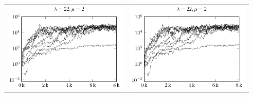 \begin{tabular}{@{}l@{}l@{}}
\includegraphics[scale=1]{plots/ce_ConstantNoise_l22_o2_all}&
\includegraphics[scale=1]{plots/ce_ConstantNoise_l22_o2_all}
\end{tabular}

